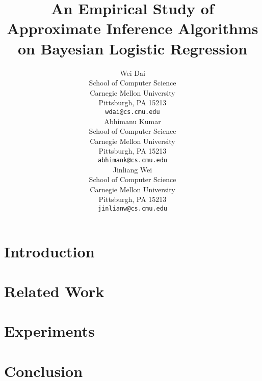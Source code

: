 \documentclass{article}
\title{An Empirical Study of Approximate Inference Algorithms on Bayesian
Logistic Regression}
\author{
Wei Dai \\
School of Computer Science \\
Carnegie Mellon University\\
Pittsburgh, PA 15213\\
\texttt{wdai@cs.cmu.edu}\\
\And
Abhimanu Kumar \\
School of Computer Science \\
Carnegie Mellon University\\
Pittsburgh, PA 15213\\
\texttt{abhimank@cs.cmu.edu}\\
\And
Jinliang Wei \\
School of Computer Science \\
Carnegie Mellon University\\
Pittsburgh, PA 15213\\
\texttt{jinlianw@cs.cmu.edu}\\
}
\begin{document}
\maketitle

\setcounter{page}{1}

\section{Introduction}

\section{Related Work}


\section{Experiments}

\section{Conclusion}

\end{document}
